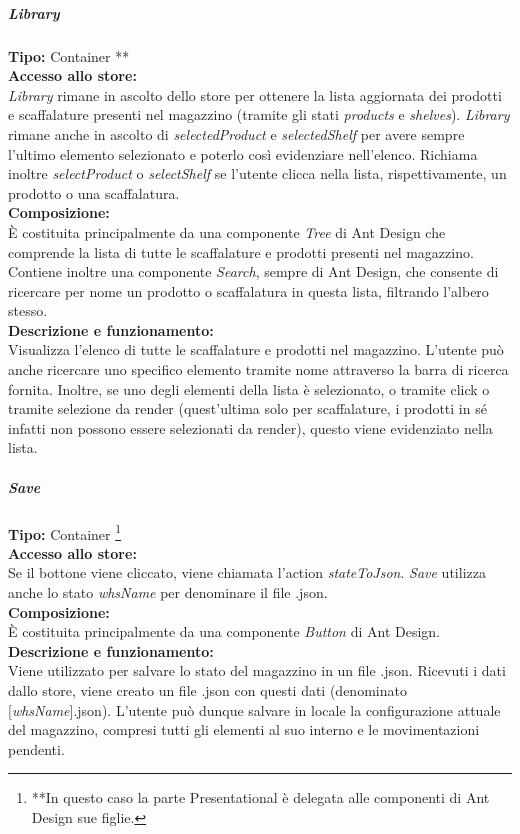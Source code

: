 \subparagraph{\colorbox{verde_uml}{Library}}
\textbf{Tipo:} Container ** \\
\textbf{Accesso allo store:} \\
\textit{Library} rimane in ascolto dello store per ottenere la lista aggiornata dei prodotti e scaffalature presenti nel magazzino (tramite gli stati \textit{products} e \textit{shelves}). \textit{Library} rimane anche in ascolto di \textit{selectedProduct} e \textit{selectedShelf} per avere sempre l'ultimo elemento selezionato e poterlo così evidenziare nell'elenco. Richiama inoltre \textit{selectProduct} o \textit{selectShelf} se l'utente clicca nella lista, rispettivamente, un prodotto o una scaffalatura. \\
\textbf{Composizione:} \\
È costituita principalmente da una componente \textit{Tree} di Ant Design che comprende la lista di tutte le scaffalature e prodotti presenti nel magazzino. Contiene inoltre una componente \textit{Search}, sempre di Ant Design, che consente di ricercare per nome un prodotto o scaffalatura in questa lista, filtrando l'albero stesso. \\
\textbf{Descrizione e funzionamento:} \\
Visualizza l'elenco di tutte le scaffalature e prodotti nel magazzino. L'utente può anche ricercare uno specifico elemento tramite nome attraverso la barra di ricerca fornita. Inoltre, se uno degli elementi della lista è selezionato, o tramite click o tramite selezione da render (quest'ultima solo per scaffalature, i prodotti in sé infatti non possono essere selezionati da render), questo viene evidenziato nella lista.

\subparagraph{\colorbox{verde_uml}{Save}}
\textbf{Tipo:} Container \footnote[**]{**In questo caso la parte Presentational è delegata alle componenti di Ant Design sue figlie.}\\
\textbf{Accesso allo store:} \\
Se il bottone viene cliccato, viene chiamata l'action \textit{stateToJson}. \textit{Save} utilizza anche lo stato \textit{whsName} per denominare il file .json.\\
\textbf{Composizione:} \\
È costituita principalmente da una componente \textit{Button} di Ant Design. \\
\textbf{Descrizione e funzionamento:} \\
Viene utilizzato per salvare lo stato del magazzino in un file .json. Ricevuti i dati dallo store, viene creato un file .json con questi dati (denominato [\textit{whsName}].json). L'utente può dunque salvare in locale la configurazione attuale del magazzino, compresi tutti gli elementi al suo interno e le movimentazioni pendenti.

